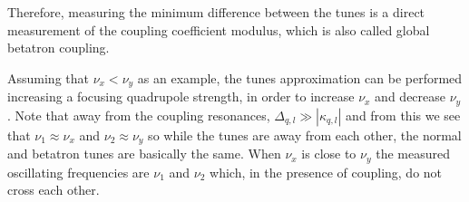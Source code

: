 Therefore, measuring the minimum difference between the tunes is a direct measurement of the coupling coefficient modulus, which is also called global betatron coupling. 

Assuming that $\nu_x < \nu_y$ as an example, the tunes approximation can be performed increasing a focusing quadrupole strength, in order to increase $\nu_x$ and decrease $\nu_y$. Note that away from the coupling resonances, $\Delta_{q, l} \gg |\kappa_{q, l}|$ and from this we see that $\nu_1 \approx \nu_x$ and $\nu_2 \approx \nu_y$ so while the tunes are away from each other, the normal and betatron tunes are basically the same. When $\nu_x$ is close to $\nu_y$ the measured oscillating frequencies are $\nu_1$ and $\nu_2$ which, in the presence of coupling, do not cross each other.








